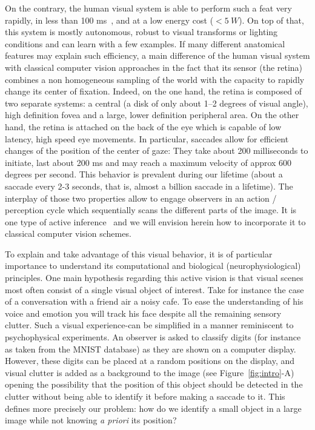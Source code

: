 On the contrary, the human visual system is able to perform such a feat very rapidly, in less than 100 ms~\citep{Kirchner06}, and at a low energy cost ($<5~W$). On top of that, this system is mostly autonomous, robust to visual transforms or lighting conditions and can learn with a few examples. If many different anatomical features may explain such efficiency, a main difference of the human visual system with classical computer vision approaches in the fact that its sensor (the retina) combines a non homogeneous sampling of the world with the capacity to rapidly change its center of fixation. Indeed, on the one hand, the retina is composed of two separate systems: a central (a disk of only about 1–2 degrees of visual angle), high definition fovea and a large, lower definition peripheral area. On the other hand, the retina is attached on the back of the eye which is capable of low latency, high speed eye movements. In particular, saccades allow for efficient changes of the position of the center of gaze: They take about 200 milliseconds to initiate, last about 200 ms and may reach a maximum velocity of approx 600 degrees per second. This behavior is prevalent during our lifetime (about a saccade every 2-3 seconds, that is, almost a billion saccade in a lifetime). The interplay of those two properties allow to engage observers in an action / perception cycle which sequentially scans the different parts of the image. It is one type of active inference~\citep{Friston12} and we will envision herein how to incorporate it to classical computer vision schemes.

To explain and take advantage of this visual behavior, it is of particular importance to understand its computational and biological (neurophysiological) principles. One main hypothesis regarding this active vision is that visual scenes most often consist of a single visual object of interest. Take for instance the case of a conversation with a friend air a noisy cafe. To ease the understanding of his voice and emotion you will track his face despite all the remaining sensory clutter. Such a visual experience-can be simplified in a manner reminiscent to psychophysical experiments. An observer is asked to classify digits (for instance as taken from the MNIST database) as they are shown on a computer display. However, these digits can be placed at a random positions on the display, and visual clutter is added as a background to the image (see Figure~\ref{fig:intro}-A) opening the possibility that the position of this object should be detected in the clutter without being able to identify it before making a saccade to it. This defines more precisely our problem: how do we identify a small object in a large image while not knowing \emph{a priori} its position?

